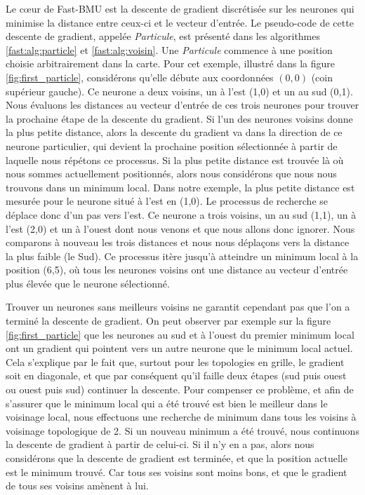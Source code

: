 	Le cœur de Fast-BMU est la descente de gradient discrétisée sur les neurones qui minimise la distance entre ceux-ci et le vecteur d'entrée. Le pseudo-code de cette descente de gradient, appelée \textit{Particule}, est présenté dans les algorithmes \ref{fast:alg:particle} et \ref{fast:alg:voisin}. Une \textit{Particule} commence à une position choisie arbitrairement dans la carte. Pour cet exemple, illustré dans la figure \ref{fig:first_particle}, considérons qu'elle débute aux coordonnées $(0,0)$ (coin supérieur gauche). Ce neurone a deux voisins, un à l'est (1,0) et un au sud (0,1). Nous évaluons les distances au vecteur d'entrée de ces trois neurones pour trouver la prochaine étape de la descente du gradient. Si l'un des neurones voisins donne la plus petite distance, alors la descente du gradient va dans la direction de ce neurone particulier, qui devient la prochaine position sélectionnée à partir de laquelle nous répétons ce processus. Si la plus petite distance est trouvée là où nous sommes actuellement positionnés, alors nous considérons que nous nous trouvons dans un minimum local. Dans notre exemple, la plus petite distance est mesurée pour le neurone situé à l'est en (1,0). Le processus de recherche se déplace donc d'un pas vers l'est. Ce neurone a trois voisins, un au sud (1,1), un à l'est (2,0) et un à l'ouest dont nous venons et que nous allons donc ignorer. Nous comparons à nouveau les trois distances et nous nous déplaçons vers la distance la plus faible (le Sud). Ce processus itère jusqu'à atteindre un minimum local à la position (6,5), où tous les neurones voisins ont une distance au vecteur d'entrée plus élevée que le neurone sélectionné.

	Trouver un neurones sans meilleurs voisins ne garantit cependant pas que l'on a terminé la descente de gradient. On peut observer par exemple sur la figure \ref{fig:first_particle} que les neurones au sud et à l'ouest du premier minimum local ont un gradient qui pointent vers un autre neurone que le minimum local actuel. Cela s'explique par le fait que, surtout pour les topologies en grille, le gradient soit en diagonale, et que par conséquent qu'il faille deux étapes (sud puis ouest ou ouest puis sud) continuer la descente. Pour compenser ce problème, et afin de s'assurer que le minimum local qui a été trouvé est bien le meilleur dans le voisinage local, nous effectuons une recherche de minimum dans tous les voisins à voisinage topologique de 2. Si un nouveau minimum a été trouvé, nous continuons la descente de gradient à partir de celui-ci. Si il n'y en a pas, alors nous considérons que la descente de gradient est terminée, et que la position actuelle est le minimum trouvé. Car tous ses voisins sont moins bons, et que le gradient de tous ses voisins amènent à lui.

